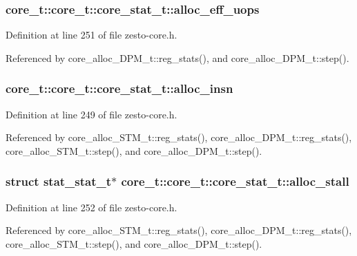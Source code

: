 \subsubsection[{alloc\_\-eff\_\-uops}]{ core\_\-t::core\_\-t::core\_\-stat\_\-t::alloc\_\-eff\_\-uops}\label{structcore__t_1_1core__stat__t_e93b01079b3578812e863d16d8415181}




Definition at line 251 of file zesto-core.h.

Referenced by core\_\-alloc\_\-DPM\_\-t::reg\_\-stats(), and core\_\-alloc\_\-DPM\_\-t::step().
\subsubsection[{alloc\_\-insn}]{ core\_\-t::core\_\-t::core\_\-stat\_\-t::alloc\_\-insn}\label{structcore__t_1_1core__stat__t_b6347c3786e3c046e4245efdcbfc2ff5}




Definition at line 249 of file zesto-core.h.

Referenced by core\_\-alloc\_\-STM\_\-t::reg\_\-stats(), core\_\-alloc\_\-DPM\_\-t::reg\_\-stats(), core\_\-alloc\_\-STM\_\-t::step(), and core\_\-alloc\_\-DPM\_\-t::step().
\subsubsection[{alloc\_\-stall}]{\setlength{\rightskip}{0pt plus 5cm}struct {\bf stat\_\-stat\_\-t}$\ast$ core\_\-t::core\_\-t::core\_\-stat\_\-t::alloc\_\-stall\hspace{0.3cm}{\tt  [read]}}\label{structcore__t_1_1core__stat__t_41f400ef3a4396e148bdc3d1872ffe86}




Definition at line 252 of file zesto-core.h.

Referenced by core\_\-alloc\_\-STM\_\-t::reg\_\-stats(), core\_\-alloc\_\-DPM\_\-t::reg\_\-stats(), core\_\-alloc\_\-STM\_\-t::step(), and core\_\-alloc\_\-DPM\_\-t::step().
